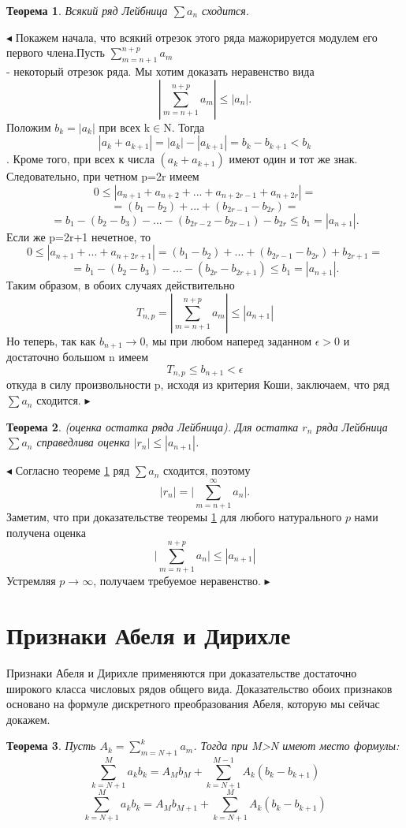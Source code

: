 \documentclass[12pt,titlepage]{report}
\newtheorem{theorem}{Теорема}
\begin{document}
\begin{theorem}\label{st}Всякий ряд Лейбница $\sum a_{n}$ сходится.\end{theorem}
$\blacktriangleleft$ Покажем начала, что всякий отрезок этого ряда мажорируется модулем его первого члена.Пусть $\sum_{m=n+1}^{n+p} a_{m}$\\
- некоторый отрезок ряда. Мы хотим доказать неравенство вида
$$|\sum_{m=n+1}^{n+p} a_{m}|\le|a_{n}|.$$
Положим $b_{k}=|a_{k}|$ при всех k$\in$N. Тогда
$$|a_{k}+a_{k+1}|=|a_{k}|-|a_{k+1}|=b_{k}-b_{k+1}<b_{k}$$.
Кроме того, при всех к числа $(a_{k}+a_{k+1})$ имеют один и тот же знак. Следовательно, при четном p=2r имеем
$$0\le|a_{n+1}+a_{n+2}+...+a_{n+2r-1}+a_{n+2r}|=$$
$$=(b_{1}-b_{2})+...+(b_{2r-1}-b_{2r})=$$
$$=b_{1}-(b_{2}-b_{3})-...-(b_{2r-2}-b_{2r-1})-b_{2r}\le b_{1}=|a_{n+1}|.$$
Если же p=2r+1 нечетное, то
$$0\le|a_{n+1}+...+a_{n+2r+1}|=(b_{1}-b_{2})+...+(b_{2r-1}-b_{2r})+b_{2r+1}=$$
$$=b_{1}-(b_{2}-b_{3})-...-(b_{2r}-b_{2r+1})\le b_{1}=|a_{n+1}|.$$
Таким образом, в обоих случаях действительно
$$T_{n,p}=|\sum_{m=n+1}^{n+p} a_{m}|\le|a_{n+1}|$$
Но теперь, так как $b_{n+1}\to$0, мы при любом наперед заданном $\epsilon>0$ и достаточно большом n имеем
$$T_{n,p}\le b_{n+1}<\epsilon$$
откуда в силу произвольности p, исходя из критерия Коши, заключаем, что ряд $\sum a_{n}$ сходится. $\blacktriangleright$ 

\begin{theorem}(оценка остатка ряда Лейбница). Для остатка $r_{n}$ ряда Лейбница $\sum a_{n}$ справедлива оценка $|r_{n}|\le|a_{n+1}|$.\end{theorem}

$\blacktriangleleft$ Согласно теореме \ref{st} ряд $\sum a_{n}$ сходится, поэтому
$$|r_{n}|=\Biggl|\sum_{m=n+1}^\infty a_{n}\Biggr|.$$
Заметим, что при доказательстве теоремы \ref{st} для любого натурального $p$ нами получена оценка
$$\Biggl|\sum_{m=n+1}^{n+p} a_{n}\Biggr|\le|a_{n+1}|$$
Устремляя $p\to\infty$, получаем требуемое неравенство. $\blacktriangleright$


\section{Признаки Абеля и Дирихле}

Признаки Абеля и Дирихле применяются при доказательстве достаточно широкого класса числовых рядов общего вида. Доказательство обоих признаков основано на формуле дискретного преобразования Абеля, которую мы сейчас докажем.
\begin{theorem}Пусть $A_{k}=\sum_{m=N+1}^k a_{m}$. Тогда при M>N имеют место формулы:
\begin{equation}\label{nfirst}\sum_{k=N+1}^M a_{k}b_{k}=A_{M}b_{M}+\sum_{k=N+1}^{M-1}A_{k}(b_{k}-b_{k+1})\end{equation}
\begin{equation}\label{second}\sum_{k=N+1}^M a_{k}b_{k}=A_{M}b_{M+1}+\sum_{k=N+1}^M A_{k}(b_{k}-b_{k+1})\end{equation}
\end{theorem}
\end{document}

